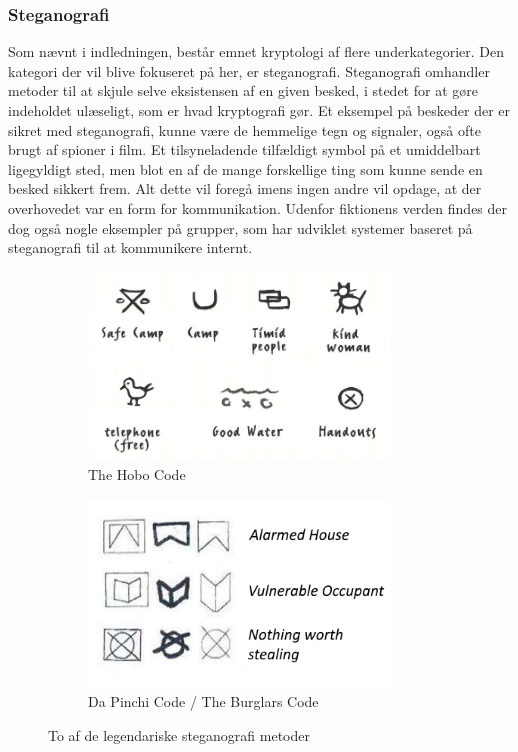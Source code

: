 \subsubsection{Steganografi}
Som nævnt i indledningen, består emnet kryptologi af flere underkategorier. Den kategori der vil blive fokuseret på her, er steganografi. Steganografi omhandler metoder til at skjule selve eksistensen af en given besked, i stedet for at gøre indeholdet ulæseligt, som er hvad kryptografi gør.\cite{MeningOfSteganografi} Et eksempel på beskeder der er sikret med steganografi, kunne være de hemmelige tegn og signaler, også ofte brugt af spioner i film. Et tilsyneladende tilfældigt symbol på et umiddelbart ligegyldigt sted, men blot en af de mange forskellige ting som kunne sende en besked sikkert frem. Alt dette vil foregå imens ingen andre vil opdage, at der overhovedet var en form for kommunikation. Udenfor fiktionens verden findes der dog også nogle eksempler på grupper, som har udviklet systemer baseret på steganografi til at kommunikere internt.
\begin{figure}[H]
    \begin{subfigure}{0.5\textwidth}
    \includegraphics[width=0.9\linewidth, height=5cm]{Projectdoc/Problemanalyse/Illustrationer/hobo.jpg} 
    \caption{The Hobo Code}
    \label{fig:hobocode}
    \end{subfigure}
    \begin{subfigure}{0.5\textwidth}
    \includegraphics[width=0.9\linewidth, height=5cm]{Projectdoc/Problemanalyse/Illustrationer/da-code.png}
    \caption{Da Pinchi Code / The Burglars Code}
    \label{fig:burglarscode}
    \end{subfigure}
    \caption{To af de legendariske steganografi metoder}
    \label{fig:legendscode}
\end{figure}
